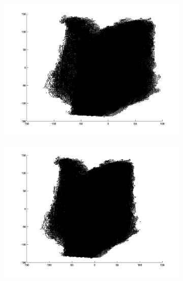 \begin{figure}
	\begin{subfigure}[b]{0.3\textwidth}
		\centering
		\includegraphics[width=\textwidth]{Images/Book19.png}
		\caption{}
	\end{subfigure}%
	\begin{subfigure}[b]{0.3\textwidth}
		\centering
		\includegraphics[width=\textwidth]{Images/Book20.png}
		\caption{}
	\end{subfigure}
	\begin{subfigure}[b]{0.3\textwidth}
		\centering

\end{subfigure}
\end{figure}

